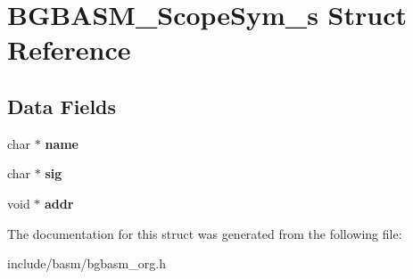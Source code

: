 \hypertarget{structBGBASM__ScopeSym__s}{\section{B\-G\-B\-A\-S\-M\-\_\-\-Scope\-Sym\-\_\-s Struct Reference}
\label{structBGBASM__ScopeSym__s}
}
\subsection*{Data Fields}
\begin{DoxyCompactItemize}
\item 
\hypertarget{structBGBASM__ScopeSym__s_ac07e5dd81e8afa4435ca003f8a00b993}{char $\ast$ {\bfseries name}}\label{structBGBASM__ScopeSym__s_ac07e5dd81e8afa4435ca003f8a00b993}

\item 
\hypertarget{structBGBASM__ScopeSym__s_a96360ea2d087551514df6c0223926ac4}{char $\ast$ {\bfseries sig}}\label{structBGBASM__ScopeSym__s_a96360ea2d087551514df6c0223926ac4}

\item 
\hypertarget{structBGBASM__ScopeSym__s_a2c3c85e0510bfb8cbd39f7ef2eb4ceab}{void $\ast$ {\bfseries addr}}\label{structBGBASM__ScopeSym__s_a2c3c85e0510bfb8cbd39f7ef2eb4ceab}

\end{DoxyCompactItemize}


The documentation for this struct was generated from the following file\-:\begin{DoxyCompactItemize}
\item 
include/basm/bgbasm\-\_\-org.\-h\end{DoxyCompactItemize}
